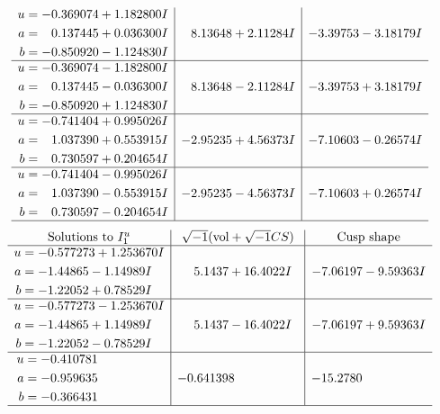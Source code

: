 \documentclass[1p]{elsarticle_modified}
\theoremstyle{definition}
\newcommand{\I}{\sqrt{-1}}
\begin{document}
$$\begin{array}{c|c|c}
\begin{aligned}
u &= -0.369074 + 1.182800 I \\
a &= \phantom{-}0.137445 + 0.036300 I \\
b &= -0.850920 - 1.124830 I\end{aligned}
 & \phantom{-}8.13648 + 2.11284 I & -3.39753 - 3.18179 I \\ \hline\begin{aligned}
u &= -0.369074 - 1.182800 I \\
a &= \phantom{-}0.137445 - 0.036300 I \\
b &= -0.850920 + 1.124830 I\end{aligned}
 & \phantom{-}8.13648 - 2.11284 I & -3.39753 + 3.18179 I \\ \hline\begin{aligned}
u &= -0.741404 + 0.995026 I \\
a &= \phantom{-}1.037390 + 0.553915 I \\
b &= \phantom{-}0.730597 + 0.204654 I\end{aligned}
 & -2.95235 + 4.56373 I & -7.10603 - 0.26574 I \\ \hline\begin{aligned}
u &= -0.741404 - 0.995026 I \\
a &= \phantom{-}1.037390 - 0.553915 I \\
b &= \phantom{-}0.730597 - 0.204654 I\end{aligned}
 & -2.95235 - 4.56373 I & -7.10603 + 0.26574 I\\
 \hline 
 \end{array}$$\newpage$$\begin{array}{c|c|c}  
\text{Solutions to }I^u_{1}& \I (\text{vol} + \sqrt{-1}CS) & \text{Cusp shape}\\
 \hline 
\begin{aligned}
u &= -0.577273 + 1.253670 I \\
a &= -1.44865 - 1.14989 I \\
b &= -1.22052 + 0.78529 I\end{aligned}
 & \phantom{-}5.1437 + 16.4022 I & -7.06197 - 9.59363 I \\ \hline\begin{aligned}
u &= -0.577273 - 1.253670 I \\
a &= -1.44865 + 1.14989 I \\
b &= -1.22052 - 0.78529 I\end{aligned}
 & \phantom{-}5.1437 - 16.4022 I & -7.06197 + 9.59363 I \\ \hline\begin{aligned}
u &= -0.410781\phantom{ +0.000000I} \\
a &= -0.959635\phantom{ +0.000000I} \\
b &= -0.366431\phantom{ +0.000000I}\end{aligned}
 & -0.641398\phantom{ +0.000000I} & -15.2780\phantom{ +0.000000I}\\
 \hline 
 \end{array}$$\newpage\newpage\renewcommand{\arraystretch}{1}
\end{document}
